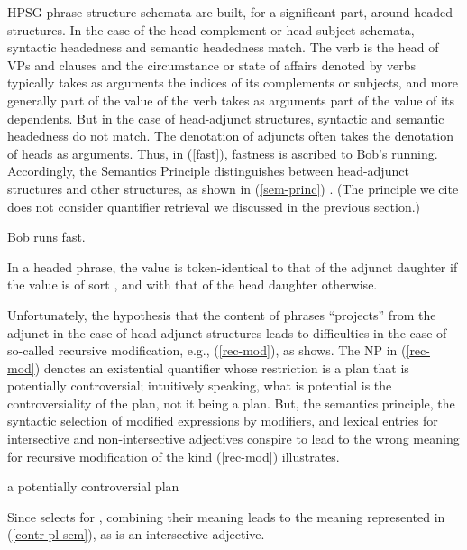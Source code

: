 \documentclass[output=paper]{langsci/langscibook}
\begin{document}
HPSG phrase structure schemata are  built, for a significant part, around headed structures. In the case of the head-complement or head-subject schemata, syntactic headedness and semantic headedness match. The verb is the head of VPs and clauses and the circumstance or state of affairs denoted by verbs typically takes as arguments the indices of its complements or subjects, and more generally part of the  value of the verb takes as arguments part of the  value of its dependents. But in the case of head-adjunct structures, syntactic and semantic headedness do not match. The denotation of adjuncts often takes the denotation of heads as arguments. Thus, in (\ref{fast}), fastness is ascribed to Bob's running. Accordingly, the Semantics Principle distinguishes between head-adjunct structures and other structures, as shown in (\ref{sem-princ}) \citep[56]{PollardandSag1994}. (The principle we cite does not consider quantifier retrieval we discussed in the previous section.)

\begin{exe}
\ex\label{fast} Bob runs fast.
\end{exe} 

\begin{exe}
\ex\label{sem-princ}
In a headed phrase, the  value is token-identical to that of the adjunct daughter if the  value is of sort , and with that of the head daughter otherwise.
\end{exe}

Unfortunately, the hypothesis that the content of phrases ``projects'' from the adjunct in the case of head-adjunct structures leads to difficulties in the case of so-called recursive modification, e.g., (\ref{rec-mod}), as \citet{Kasper1997} shows. The NP in (\ref{rec-mod}) denotes an existential quantifier whose restriction is a plan that is potentially controversial; intuitively speaking, what is potential is the controversiality of the plan, not it being a plan. But, the semantics principle, the syntactic selection of modified expressions by modifiers, and lexical entries for intersective and non-intersective adjectives conspire to lead to the wrong meaning for recursive modification of the kind (\ref{rec-mod}) illustrates.

\begin{exe}
\ex\label{rec-mod}a potentially controversial plan
\end{exe}

Since  selects for , combining their meaning leads to the meaning represented in (\ref{contr-pl-sem}), as  is an intersective adjective.
\end{document}
